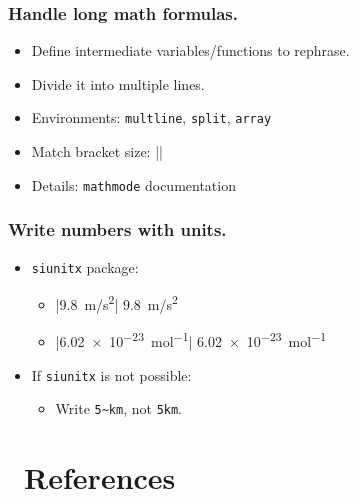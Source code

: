\documentclass[CJKchecksingle]{beamer}
\newcommand{\env}[1]{\lstinline|#1|}
\newcommand{\pkg}[1]{\texttt{#1}}
\newcommand{\BibTeX}{\hologo{BibTeX}}
\begin{document}
\begin{frame}[fragile]\frametitle{Handle long math formulas.}

\begin{itemize}
\item
  Define intermediate variables/functions to rephrase.
\item
  Divide it into multiple lines.
\item
  Environments: \env{multline}, \env{split}, \env{array}
\item
  Match bracket size: |\vphantom|
\item
  Details: \pkg{mathmode} documentation
\end{itemize}

\end{frame}

\begin{frame}[fragile]\frametitle{Write numbers with units.}

\begin{itemize}
\item
  \pkg{siunitx} package:
  \begin{itemize}
    \item |\SI{9.8}{m/s^2}| \SI{9.8}{m/s^2}
    \item |\SI{6.02e-23}{mol^{-1}}| \SI{6.02e-23}{mol^{-1}}
  \end{itemize}
\item
  If \pkg{siunitx} is not possible:
  \begin{itemize}
    \item Write \lstinline{5~km}, not \lstinline{5km}.\nocite{commonerrors}
  \end{itemize}
\end{itemize}

\end{frame}

\section{\BibTeX\ References}
\end{document}
